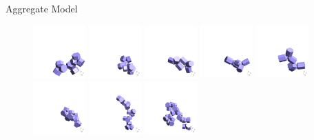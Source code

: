 \documentclass[12pt]{beamer}
\begin{document}
\begin{frame}{Aggregate Model}
\begin{figure}
    \includegraphics[width = 0.18\textwidth]{Figures/aggregates/aggregate805.png}
    \includegraphics[width = 0.18\textwidth]{Figures/aggregates/aggregate875.png}
    \includegraphics[width = 0.18\textwidth]{Figures/aggregates/aggregate958.png}
    \hfill
    \includegraphics[width = 0.18\textwidth]{Figures/aggregates/aggregate1008.png}
    \includegraphics[width = 0.18\textwidth]{Figures/aggregates/aggregate1045.png}
    \includegraphics[width = 0.18\textwidth]{Figures/aggregates/aggregate1111.png}
    \includegraphics[width = 0.18\textwidth]{Figures/aggregates/aggregate1160.png}
    \includegraphics[width = 0.18\textwidth]{Figures/aggregates/aggregate1190.png}

\end{figure}
\end{frame}
\end{document}
